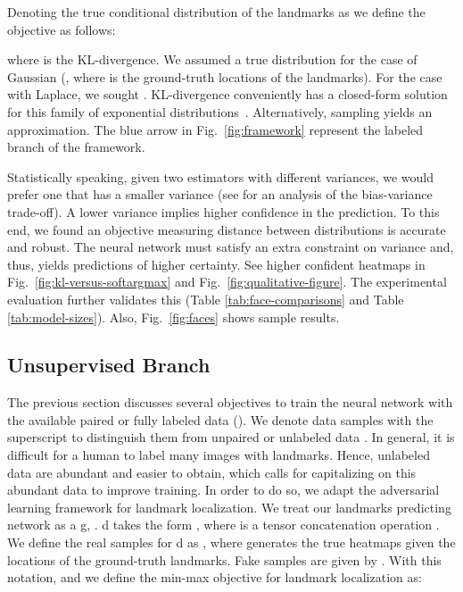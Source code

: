 \documentclass[10pt,twocolumn,letterpaper]{article}
\begin{document}
Denoting the true conditional distribution of the landmarks as  we define the objective as follows:

where  is the KL-divergence. We assumed a true distribution for the case of Gaussian (\ie , where  is the ground-truth locations of the landmarks). For the case with Laplace, we sought . KL-divergence conveniently has a closed-form solution for this family of exponential distributions~\cite{hoffman2013stochastic}. Alternatively, sampling yields an approximation. The blue arrow in Fig.~\ref{fig:framework} represent the labeled branch of the framework.

Statistically speaking, given two estimators with different variances, we would prefer one that has a smaller variance (see \cite{domingos2000unified} for an analysis of the bias-variance trade-off). A lower variance implies higher confidence in the prediction. To this end, we found an objective measuring distance between distributions is accurate and robust. The neural network must satisfy an extra constraint on variance and, thus, yields predictions of higher certainty. See higher confident heatmaps in Fig.~\ref{fig:kl-versus-softargmax} and Fig.~\ref{fig:qualitative-figure}. The experimental evaluation further validates this (Table \ref{tab:face-comparisons} and Table \ref{tab:model-sizes}). Also, Fig.~\ref{fig:faces} shows sample results.





\subsection{Unsupervised Branch}
\label{sec:no-labels}
The previous section discusses several objectives to train the neural network with the available paired or fully labeled data (\ie ). We denote data samples with the superscript  to distinguish them from unpaired or unlabeled data . In general, it is difficult for a human to label many images with landmarks. Hence, unlabeled data are abundant and easier to obtain, which calls for capitalizing on this abundant data to improve training. In order to do so, we adapt the adversarial learning framework for landmark localization. We treat our landmarks predicting network as a \gls{g}, . \gls{d} takes the form , where  is a tensor concatenation operation . We define the real samples for \gls{d} as , where  generates the true heatmaps given the locations of the ground-truth landmarks. Fake samples are given by . With this notation, and we define the min-max objective for landmark localization as:
\end{document}
